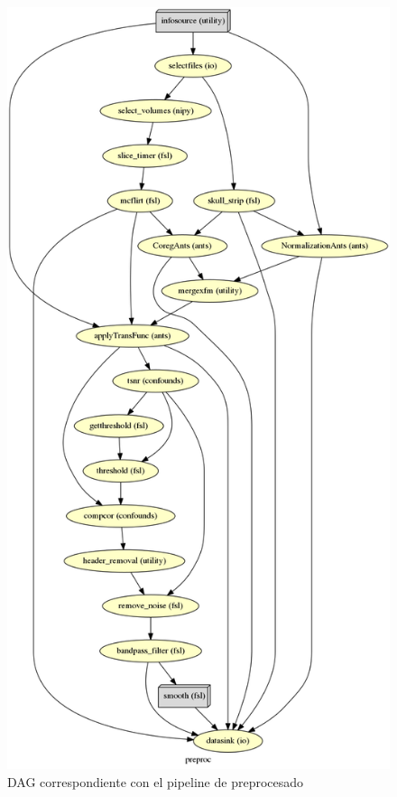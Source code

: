 \begin{figure}[H]
	\includegraphics[width=\linewidth, height=\textheight, keepaspectratio]{img/preproc/graph.png}
	\caption{DAG correspondiente con el pipeline de preprocesado}
	\label{preproc:pipeline}
\end{figure}
